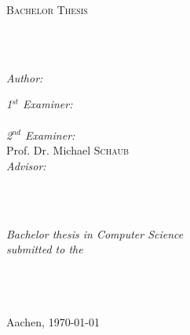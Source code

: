 \documentclass[
12pt, %
english, %
onehalfspacing, %
nolistspacing, %
headsepline, %
]{MastersDoctoralThesis} %
\author{Simon \textsc{Michau}} %
\begin{document}
\frontmatter %

\pagestyle{plain} %


\begin{titlepage}
\begin{center}

\vspace*{.06\textheight}
{\scshape\LARGE \univname\par}\vspace{0.5cm} %
\textsc{\Large Bachelor Thesis}\\[0.25cm] %

\HRule \\%
{\huge \bfseries \ttitle\par}%
\HRule \\[1.25cm] %
 
\begin{minipage}[t]{0.4\textwidth}
\begin{flushleft} \large
\emph{Author:}\\
\authorname %
\end{flushleft}
\end{minipage}
\begin{minipage}[t]{0.4\textwidth}
\begin{flushright} \large
\emph{1$^{st}$ Examiner:}\\
\examname\\
\emph{2$^{nd}$ Examiner:}\\
Prof. Dr. Michael \textsc{Schaub}\\
\emph{Advisor:} \\
\supname\\ %
\end{flushright}
\end{minipage}\\[1.25cm]
 
\vfill

\large \textit{Bachelor thesis in Computer Science}\\%
\textit{submitted to the}\\[0.4cm]
\groupname\\\deptname\\\univname\\%
 
\vfill

Aachen, {\large \today}\\[4cm] %
 
\vfill
\end{center}
\end{titlepage}
\end{document}
